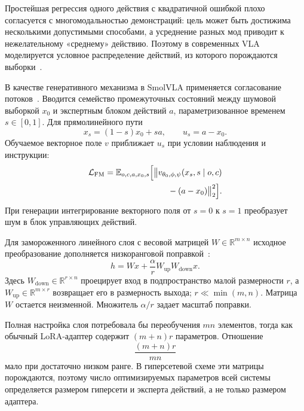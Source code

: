 \documentclass{misisarticle}
\begin{document}
Простейшая регрессия одного действия с квадратичной ошибкой плохо согласуется с многомодальностью демонстраций: цель может быть достижима несколькими допустимыми способами, а усреднение разных мод приводит к нежелательному «среднему» действию. Поэтому в современных VLA моделируется условное распределение действий, из которого порождаются выборки~\cite{octo,smolvla}.

В качестве генеративного механизма в SmolVLA применяется согласование потоков~\cite{smolvla,flowmatching}. Вводится семейство промежуточных состояний между шумовой выборкой $x_0$ и экспертным блоком действий $a$, параметризованное временем $s\in[0,1]$. Для прямолинейного пути
\begin{equation}
  x_s=(1-s)x_0+sa,\qquad u_s=a-x_0.
\end{equation}
Обучаемое векторное поле $v$ приближает $u_s$ при условии наблюдения и инструкции:
\begin{equation}
\begin{split}
  \mathcal{L}_{\mathrm{FM}}=\mathbb{E}_{o,c,a,x_0,s}\Bigl[
  \bigl\|v_{\theta_0,\phi,\psi}(x_s,s\mid o,c)\\
  {}-(a-x_0)\bigr\|_2^2\Bigr].
\end{split}
\label{eq:fm}
\end{equation}
При генерации интегрирование векторного поля от $s=0$ к $s=1$ преобразует шум в блок управляющих действий.

Для замороженного линейного слоя с весовой матрицей $W\in\mathbb{R}^{m\times n}$ исходное преобразование дополняется низкоранговой поправкой~\cite{lora}:
\begin{equation}
  h=Wx+\frac{\alpha}{r}W_{\mathrm{up}}W_{\mathrm{down}}x.
\label{eq:lora}
\end{equation}
Здесь $W_{\mathrm{down}}\in\mathbb{R}^{r\times n}$ проецирует вход в подпространство малой размерности $r$, а $W_{\mathrm{up}}\in\mathbb{R}^{m\times r}$ возвращает его в размерность выхода; $r\ll\min(m,n)$. Матрица $W$ остается неизменной. Множитель $\alpha/r$ задает масштаб поправки.

Полная настройка слоя потребовала бы переобучения $mn$ элементов, тогда как обычный LoRA-адаптер содержит $(m+n)r$ параметров. Отношение
\begin{equation}
  \frac{(m+n)r}{mn}
\end{equation}
мало при достаточно низком ранге. В гиперсетевой схеме эти матрицы порождаются, поэтому число оптимизируемых параметров всей системы определяется размером гиперсети и эксперта действий, а не только размером адаптера.
\end{document}
